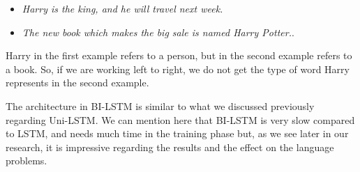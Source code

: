 \begin{itemize}
\item \textit{Harry is the king, and he will travel next week.}
\item \textit{The new book which makes the big sale is named Harry Potter.}.
\end{itemize}

Harry in the first example refers to a person, but in the second example refers to a book. So, if we are working left to right, we do not get the type of word Harry represents in the second example.

The architecture in BI-LSTM is similar to what we discussed previously regarding Uni-LSTM. We can mention here that BI-LSTM is very slow compared to LSTM, and needs much time in the training phase but, as we see later in our research, it is impressive regarding the results and the effect on the language problems.

